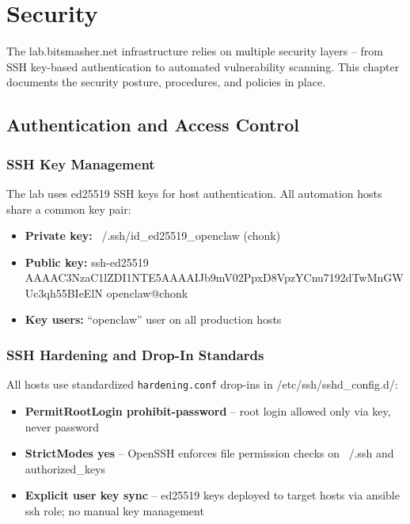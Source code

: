 
\chapter{Security}
\label{ch:security}

The lab.bitsmasher.net infrastructure relies on multiple security layers -- from SSH key-based authentication to automated vulnerability scanning. This chapter documents the security posture, procedures, and policies in place.

\section{Authentication and Access Control}

\subsection{SSH Key Management}
The lab uses ed25519 SSH keys for host authentication. All automation hosts share a common key pair:

\begin{itemize}
  \item \textbf{Private key:} ~/.ssh/id\_ed25519\_openclaw (chonk)
  \item \textbf{Public key:} ssh-ed25519 AAAAC3NzaC1lZDI1NTE5AAAAIJb9mV02PpxD8VpzYCnu7192dTwMnGWUc3qh55BIeElN openclaw@chonk
  \item \textbf{Key users:} ``openclaw'' user on all production hosts
\end{itemize}

\subsection{SSH Hardening and Drop-In Standards}

All hosts use standardized \texttt{hardening.conf} drop-ins in /etc/ssh/sshd\_config.d/:

\begin{itemize}
    \item \textbf{PermitRootLogin prohibit-password} -- root login allowed only via key, never password
  
    \item \textbf{StrictModes yes} -- OpenSSH enforces file permission checks on ~/.ssh and authorized\_keys
  
    \item \textbf{Explicit user key sync} -- ed25519 keys deployed to target hosts via ansible ssh role; no manual key management
\end{itemize}


